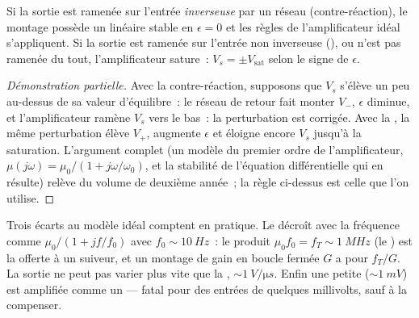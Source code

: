 \begin{proposition}\label{prop:b1:operational-amplifier:feedback}
Si la sortie est ramenée sur l'entrée \emph{inverseuse} par un réseau
(contre-réaction), le montage possède un 
linéaire stable en $\epsilon = 0$ et les règles de l'amplificateur idéal
s'appliquent. Si la sortie est ramenée sur l'entrée non inverseuse
(), ou n'est pas ramenée du tout, l'amplificateur
sature~: $V_s = \pm V_{\mathrm{sat}}$ selon le signe de $\epsilon$.
\end{proposition}

\begin{proof}[Démonstration partielle]
Avec la contre-réaction, supposons que $V_s$ s'élève un peu au-dessus de
sa valeur d'équilibre~: le réseau de retour fait monter $V_-$,
$\epsilon$ diminue, et l'amplificateur ramène $V_s$ vers le bas~: la
perturbation est corrigée. Avec la , la même
perturbation élève $V_+$, augmente $\epsilon$ et éloigne encore $V_s$
jusqu'à la saturation. L'argument complet (un modèle du premier ordre de
l'amplificateur, $\mu(j\omega)
= \mu_0/(1 + j\omega/\omega_0)$, et la stabilité de l'équation
différentielle qui en résulte) relève du volume de deuxième année~; la
règle ci-dessus est celle que l'on utilise.
\end{proof}

\begin{remark}\label{rem:b1:operational-amplifier:real}
Trois écarts au modèle idéal comptent en pratique. Le  décroît avec la fréquence comme $\mu_0/(1 + jf/f_0)$ avec $f_0 \sim \qty{10}{Hz}$~:
le produit $\mu_0 f_0 = f_T \sim \qty{1}{MHz}$ (le \emph{}) est la  offerte à un suiveur, et un
montage de gain en boucle fermée $G$ a pour  $f_T/G$. La
sortie ne peut pas varier plus vite que la \emph{},
$\sim\qty{1}{V/\micro s}$. Enfin une petite \emph{} ($\sim\qty{1}{mV}$) est amplifiée comme un  --- fatal
pour des entrées de quelques millivolts, sauf à la compenser.
\end{remark}

